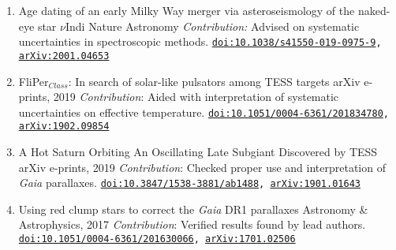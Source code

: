 \documentclass[letterpaper]{k-cv} %
\begin{document}
\begin{enumerate}
	\item {}
	{Age dating of an early Milky Way merger via asteroseismology of the naked-eye star $\nu$Indi}
	{Nature Astronomy}
	{\bodyfont \textit{Contribution:} Advised on systematic uncertainties in spectroscopic methods.}
	{\texttt{\href{https://www.nature.com/articles/s41550-019-0975-9}{doi:10.1038/s41550-019-0975-9},  \href{https://arxiv.org/abs/2001.04653}{arXiv:2001.04653}}}
%	
	\item {}
	{FliPer$_{Class}$: In search of solar-like pulsators among TESS targets}
	{arXiv e-prints, 2019}
	{\textit{Contribution}: Aided with interpretation of systematic uncertainties on effective temperature.}	
	{\texttt{\href{https://www.aanda.org/articles/aa/abs/2019/04/aa34780-18/aa34780-18.html}{doi:10.1051/0004-6361/201834780}, \href{https://arxiv.org/abs/1902.09854}{arXiv:1902.09854}}}
	
	\item {}
	{{A Hot Saturn Orbiting An Oscillating Late Subgiant Discovered by TESS}}
	{arXiv e-prints, 2019}
	{\textit{Contribution}: Checked proper use and interpretation of \textit{Gaia} parallaxes.}	
	{\texttt{\href{https://iopscience.iop.org/article/10.3847/1538-3881/ab1488}{doi:10.3847/1538-3881/ab1488}, \href{https://arxiv.org/abs/1901.01643}{arXiv:1901.01643}}}
	
	\item {}
	{Using red clump stars to correct the \emph{Gaia} DR1 parallaxes}
	{Astronomy \& Astrophysics, 2017}
	{\textit{Contribution}: Verified results found by lead authors.}	
	{\texttt{\href{https://www.aanda.org/articles/aa/abs/2017/02/aa30066-16/aa30066-16.html}{doi:10.1051/0004-6361/201630066}, \href{https://arxiv.org/abs/1701.02506}{arXiv:1701.02506}}}
\end{enumerate}
%
\vspace{-0.2cm}
\end{document}

